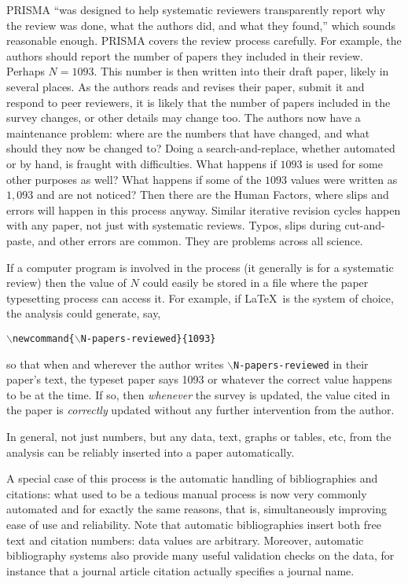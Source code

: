 \begin{change}
PRISMA ``was designed to help systematic reviewers transparently report why the review was done, what the authors did, and what they found,'' which sounds reasonable enough. PRISMA covers the review process carefully. For example, the authors should report the number of papers they included in their review. Perhaps $N=1093$. This number is then written into their draft paper, likely in several places. As the authors reads and revises their paper, submit it and respond to peer reviewers, it is likely that the number of papers included in the survey changes, or other details may change too. The authors now have a maintenance problem: where are the numbers that have changed, and what should they now be changed to? Doing a search-and-replace, whether automated or by hand, is fraught with difficulties. What happens if $1093$ is used for some other purposes as well? What happens if some of the $1093$ values were written as $1,093$ and are not noticed? Then there are the Human Factors, where slips and errors will happen in this process anyway. Similar iterative revision cycles happen with any paper, not just with systematic reviews. Typos, slips during cut-and-paste, and other errors are common. They are problems across all science.

If a computer program is involved in the process (it generally is for a systematic review) then the value of $N$ could easily be stored in a file where the paper typesetting process can access it. For example, if \LaTeX\ is the system of choice, the analysis could generate, say, 

\begin{center}\texttt{$\backslash$newcommand\{$\backslash$N-papers-reviewed\}\{1093\}}\end{center}

so that when and wherever the author writes \texttt{$\backslash$N-papers-reviewed} in their paper's text, the typeset paper says 1093 or whatever the correct value happens to be at the time. If so, then \emph{whenever\/} the survey is updated, the value cited in the paper is \emph{correctly\/} updated without any further intervention from the author. 

In general, not just numbers, but any data, text, graphs or tables, etc, from the analysis can be reliably inserted into a paper automatically. 

A special case of this process is the automatic handling of bibliographies and citations: what used to be a tedious manual process is now very commonly automated and for exactly the same reasons, that is, simultaneously improving ease of use and reliability. Note that automatic bibliographies insert both free text and citation numbers: data values are arbitrary. Moreover, automatic bibliography systems also provide many useful validation checks on the data, for instance that a journal article citation actually specifies a journal name.


\end{change}
